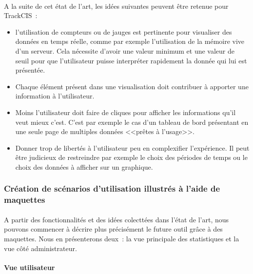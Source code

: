 			\paragraph{}
			A la suite de cet état de l'art, les idées suivantes peuvent être retenue
			pour TrackCIS~:
			\begin{itemize}
			  \item l'utilisation de compteurs ou de jauges est pertinente pour
			  visualiser des données en temps réelle, comme par exemple l'utilisation de
			  la mémoire vive d'un serveur. Cela nécessite d'avoir une valeur minimum et
			  une valeur de seuil pour que l'utilisateur puisse interpréter rapidement la
			  donnée qui lui est présentée.
			  \item Chaque élément présent dans une visualisation doit contribuer à
			  apporter une information à l'utilisateur.
			  \item Moins l'utilisateur doit faire de cliques pour afficher les
			  informations qu'il veut mieux c'est. C'est par exemple le cas d'un tableau
			  de bord présentant en une seule page de multiples données <<prêtes à
			  l'usage>>.
			  \item Donner trop de libertés à l'utilisateur peu en complexifier
			  l'expérience. Il peut être judicieux de restreindre par exemple le choix
			  des périodes de temps ou le choix des données à afficher sur un graphique.
			\end{itemize}
			
		\subsubsection{Création de scénarios d'utilisation illustrés à l'aide de
		maquettes}
			\paragraph{}
			A partir des fonctionnalités et des idées colecttées dans l'état de l'art,
			nous pouvons commencer à décrire plus précisément le future outil grâce à des
			maquettes. Nous en présenterons deux~: la vue principale des statistiques et
			la vue côté administrateur.
			
			\paragraph{Vue utilisateur}
			
